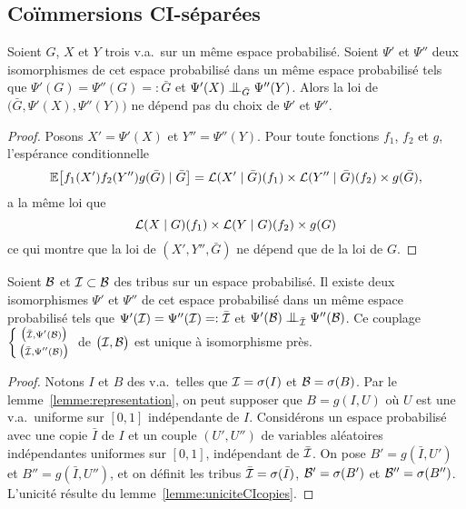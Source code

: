 \documentclass[12pt,a4paper]{article}
\begin{document}
\begin{appendices}
\section{Co\"immersions CI-séparées}

\begin{lemme}\label{lemme:uniciteCIcopies}
Soient $G$, $X$ et $Y$ trois v.a.\ sur un même espace probabilisé.  
Soient $\Psi'$ et $\Psi''$  deux isomorphismes de 
cet espace probabilisé dans un même espace probabilisé 
tels que $\Psi'(G) = \Psi''(G) =: \bar G$ et 
$\Psi'(X) \indep_{\bar G} \Psi''(Y)$.  
Alors la loi de $\bigl(\bar G, \Psi'(X), \Psi''(Y)\bigr)$ 
ne dépend pas du choix de $\Psi'$ et $\Psi''$. 
\end{lemme}

\begin{proof}
Posons $X'=\Psi'(X)$ et $Y''=\Psi''(Y)$. 
Pour toute fonctions $f_1$, $f_2$ et $g$, 
l'espérance conditionnelle 
$$
\mathbb{E}\bigl[f_1(X')f_2(Y'')g(\bar G) \mid \bar G \bigr] 
= \mathcal{L}(X'\mid\bar G)(f_1) \times \mathcal{L}(Y''\mid\bar G)(f_2) \times g(\bar G),
$$
a la même loi que 
$$
\mathcal{L}(X\mid G)(f_1) \times \mathcal{L}(Y\mid G)(f_2) \times g(G)
$$
ce qui montre que la loi de $(X',Y'',\bar G)$ ne dépend que de la loi de $G$. 
\end{proof}

\begin{lemme}\label{lemme:CIcopies}
Soient $\mathcal{B}$ et $\mathcal{I} \subset \mathcal{B}$ des tribus sur un espace probabilisé. 
Il existe deux isomorphismes $\Psi'$ et $\Psi''$  de 
cet espace probabilisé dans un même espace probabilisé 
tels que $\Psi'(\mathcal{I})=\Psi''(\mathcal{I}) =: \bar{\mathcal{I}}$ et 
 $\Psi'(\BB) \indep_{\bar \II} \Psi''(\BB)$. 
Ce couplage $\left\{\begin{smallmatrix} 
\bigl(\bar {\mathcal{I}}, \Psi'(\mathcal{B})\bigr)
\\ 
\bigl(\bar {\mathcal{I}}, \Psi''(\mathcal{B})\bigr)
\end{smallmatrix}\right.$ 
de $\bigl(\mathcal{I}, \mathcal{B}\bigr)$ est unique à isomorphisme près. 
\end{lemme}

\begin{proof}
Notons $I$ et $B$ des v.a.\ telles que $\mathcal{I}=\sigma(I)$ et $\mathcal{B}=\sigma(B)$. 
Par le lemme~\ref{lemme:representation}, on peut supposer que 
$B=g(I,U)$ où $U$ est une v.a.\ uniforme sur $[0,1]$ indépendante de $I$. 
Considérons un espace probabilisé avec une copie $\bar I$ de $I$ 
et un couple $(U', U'')$ de variables aléatoires indépendantes uniformes sur 
$[0,1]$, indépendant de $\bar{\mathcal{I}}$. 
On pose $B'=g(\bar I, U')$ et $B''=g(\bar I, U'')$, et on définit les tribus 
$\bar {\mathcal{I}}=\sigma(\bar I)$, $\mathcal{B}' = \sigma(B')$ et $\mathcal{B}'' = \sigma(B'')$. 
L'unicité résulte du lemme~\ref{lemme:uniciteCIcopies}. 
\end{proof}



\end{appendices}
\end{document}
